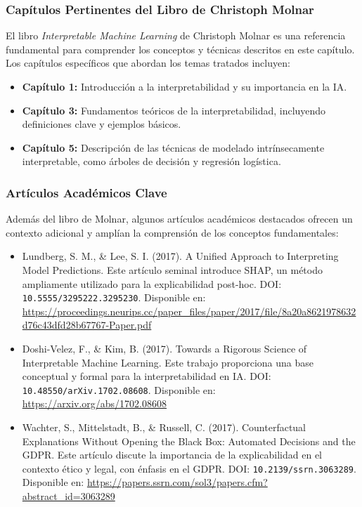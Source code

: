 \begin{refsection}
\subsubsection{Capítulos Pertinentes del Libro de Christoph Molnar}
El libro \textit{Interpretable Machine Learning} de Christoph Molnar es una referencia fundamental para comprender los conceptos y técnicas descritos en este capítulo. Los capítulos específicos que abordan los temas tratados incluyen:
\begin{itemize}
    \item \textbf{Capítulo 1:} Introducción a la interpretabilidad y su importancia en la IA.
    \item \textbf{Capítulo 3:} Fundamentos teóricos de la interpretabilidad, incluyendo definiciones clave y ejemplos básicos.
    \item \textbf{Capítulo 5:} Descripción de las técnicas de modelado intrínsecamente interpretable, como árboles de decisión y regresión logística.
\end{itemize}

\subsubsection{Artículos Académicos Clave}
Además del libro de Molnar, algunos artículos académicos destacados ofrecen un contexto adicional y amplían la comprensión de los conceptos fundamentales:

\begin{itemize}
    \item Lundberg, S. M., \& Lee, S. I. (2017). A Unified Approach to Interpreting Model Predictions. 
    Este artículo seminal introduce SHAP, un método ampliamente utilizado para la explicabilidad post-hoc. 
    DOI: \texttt{10.5555/3295222.3295230}. Disponible en: \url{https://proceedings.neurips.cc/paper_files/paper/2017/file/8a20a8621978632d76c43dfd28b67767-Paper.pdf}
    \item Doshi-Velez, F., \& Kim, B. (2017). Towards a Rigorous Science of Interpretable Machine Learning. 
    Este trabajo proporciona una base conceptual y formal para la interpretabilidad en IA. 
    DOI: \texttt{10.48550/arXiv.1702.08608}. Disponible en: \url{https://arxiv.org/abs/1702.08608}
    \item Wachter, S., Mittelstadt, B., \& Russell, C. (2017). Counterfactual Explanations Without Opening the Black Box: Automated Decisions and the GDPR. 
    Este artículo discute la importancia de la explicabilidad en el contexto ético y legal, con énfasis en el GDPR. 
    DOI: \texttt{10.2139/ssrn.3063289}. Disponible en: \url{https://papers.ssrn.com/sol3/papers.cfm?abstract_id=3063289}
\end{itemize}



\end{refsection}

